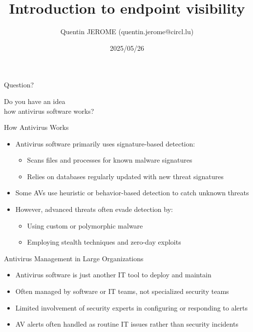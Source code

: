 \documentclass[12pt,aspectratio=169, colorlinks=true, linkcolor=circlBlue]{beamer}
\title{Introduction to endpoint visibility}
\date{2025/05/26}
\author{Quentin JEROME (quentin.jerome@circl.lu)}
\institute{University of Luxembourg - Luxembourg}
\begin{document}


\begin{frame}
	\titlepage%
\end{frame}

\begin{frame}{Question?}
	\begin{center}
		\Huge Do you have an idea\\
		how antivirus software works?
	\end{center}
\end{frame}

\begin{frame}{How Antivirus Works}
	\begin{itemize}
		\item Antivirus software primarily uses signature-based detection:
		      \begin{itemize}
			      \item Scans files and processes for known malware signatures
			      \item Relies on databases regularly updated with new threat signatures
		      \end{itemize}
		\item Some AVs use heuristic or behavior-based detection to catch unknown threats
		\item However, advanced threats often evade detection by:
		      \begin{itemize}
			      \item Using custom or polymorphic malware
			      \item Employing stealth techniques and zero-day exploits
		      \end{itemize}
	\end{itemize}
\end{frame}

\begin{frame}{Antivirus Management in Large Organizations}
	\begin{itemize}
		\item Antivirus software is just another IT tool to deploy and maintain
		\item Often managed by software or IT teams, not specialized security teams
		\item Limited involvement of security experts in configuring or responding to alerts
		\item AV alerts often handled as routine IT issues rather than security incidents
	\end{itemize}
\end{frame}
\end{document}
